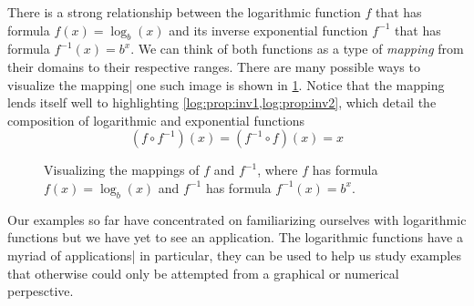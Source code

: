 There is a strong relationship between the logarithmic function $f$ that has formula
$f(x)=\log_b(x)$ and its inverse exponential function $f^{-1}$ that has formula
$f^{-1}(x)=b^x$. We can think of both functions as a type of \emph{mapping} from
their domains to their respective ranges. There are many possible ways to visualize
the mapping| one such image is shown in \cref{log:fig:mapping}. Notice that
the mapping lends itself well to highlighting \cref{log:prop:inv1,log:prop:inv2}, 
which detail the composition of logarithmic and exponential functions
\[
	(f\circ f^{-1})(x)=(f^{-1}\circ f)(x)=x
\]

\begin{figure}[!htb]
	\centering
	\caption{Visualizing the mappings of $f$ and $f^{-1}$, where $f$ 
		has formula $f(x)=\log_b(x)$ and $f^{-1}$ has formula $f^{-1}(x)=b^x$.}
	\label{log:fig:mapping}
\end{figure}

Our examples so far have concentrated on familiarizing ourselves
with logarithmic functions but we have yet to see an application. 
The logarithmic functions have a myriad of applications| in particular, 
they can be used to help us study examples  that otherwise could 
only be attempted from a graphical or numerical perpesctive.

